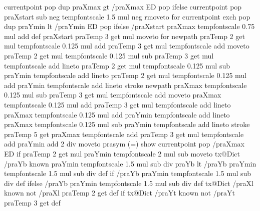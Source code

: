 {{{{{{         currentpoint pop dup praXmax gt { /praXmax ED }{ pop } ifelse
         currentpoint pop praXstart sub neg tempfontscale 1.5 mul neg rmoveto
         } for
         currentpoint exch pop dup praYmin lt { /praYmin ED }{ pop } ifelse
         /praXstart praXmax tempfontscale 0.75 mul add def
         praXstart praTemp 3 get \pst@number\psyunit\space mul moveto
         } for
          newpath
          praTemp 2 get \pst@number\psxunit\space mul tempfontscale 0.125 mul add
          praTemp 3 get \pst@number\psyunit\space mul tempfontscale add moveto
          praTemp 2 get \pst@number\psxunit\space mul tempfontscale 0.125 mul sub
          praTemp 3 get \pst@number\psyunit\space mul tempfontscale add lineto
          praTemp 2 get \pst@number\psxunit\space mul tempfontscale 0.125 mul sub
          praYmin tempfontscale add lineto
          praTemp 2 get \pst@number\psxunit\space mul tempfontscale 0.125 mul add
          praYmin tempfontscale add lineto
          stroke
          newpath
          praXmax tempfontscale 0.125 mul sub
          praTemp 3 get \pst@number\psyunit\space mul tempfontscale add moveto
          praXmax tempfontscale 0.125 mul add
          praTemp 3 get \pst@number\psyunit\space mul tempfontscale add lineto
          praXmax tempfontscale 0.125 mul add
          praYmin tempfontscale add lineto
          praXmax tempfontscale 0.125 mul sub
          praYmin tempfontscale add lineto
          stroke
          praTemp 5 get {
          praXmax tempfontscale add
          praTemp 3 get \pst@number\psyunit\space mul tempfontscale add praYmin add 2 div moveto
          prasym (=) show currentpoint pop /praXmax ED} if
         praTemp 2 get \pst@number\psxunit\space mul praYmin tempfontscale 2 mul sub moveto %
         tx@Dict /praYb known {
         praYmin tempfontscale 1.5 mul sub \pst@number\psyunit\space div praYb lt {
         /praYb praYmin tempfontscale 1.5 mul sub \pst@number\psyunit\space div def } if }
         { /praYb praYmin tempfontscale 1.5 mul sub \pst@number\psyunit\space div def } ifelse
         /praYb praYmin tempfontscale 1.5 mul sub \pst@number\psyunit\space div def
         tx@Dict /praXl known not {/praXl praTemp 2 get def } if
         tx@Dict /praYt known not {/praYt praTemp 3 get def }
}}}}
